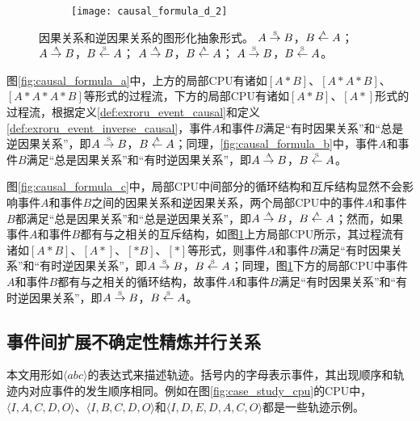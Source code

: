 \begin{figure}[htbp]
\begin{subfigure}{0.85\textwidth}
\begin{minipage}[b]{1\textwidth}
  	  \vspace{1em}
  	  \centering
  	  \texttt{[image: causal\_formula\_d\_2]}
  	\end{minipage}
  	\caption{}
  	\label{fig:causal_formula_d}
  \end{subfigure}
  \vspace{6pt}
  \caption{因果关系和逆因果关系的图形化抽象形式。 $A\overset{\text{\tiny{S}}}{\rightarrow}B$，$B\overset{\text{\tiny{A}}}{\leftarrow}A$； $A\overset{\text{\tiny{A}}}{\rightarrow}B$，$B\overset{\text{\tiny{S}}}{\leftarrow}A$； $A\overset{\text{\tiny{A}}}{\rightarrow}B$，$B\overset{\text{\tiny{A}}}{\leftarrow}A$； $A\overset{\text{\tiny{S}}}{\rightarrow}B$，$B\overset{\text{\tiny{S}}}{\leftarrow}A$。}
  \label{fig:event_causal_formulas}
\end{figure}

图\ref{fig:causal_formula_a}中，上方的局部CPU有诸如$[A*B]$、$[A*A*B]$、$[A*A*A*B]$等形式的过程流，下方的局部CPU有诸如$[A*B]$、$[A*]$形式的过程流，根据定义\ref{def:exroru_event_causal}和定义\ref{def:exroru_event_inverse_causal}，事件$A$和事件$B$满足“有时因果关系”和“总是逆因果关系”，即$A\overset{\text{\tiny{S}}}{\rightarrow}B$，$B\overset{\text{\tiny{A}}}{\leftarrow}A$；同理，\ref{fig:causal_formula_b}中，事件$A$和事件$B$满足“总是因果关系”和“有时逆因果关系”，即$A\overset{\text{\tiny{A}}}{\rightarrow}B$，$B\overset{\text{\tiny{S}}}{\leftarrow}A$。

图\ref{fig:causal_formula_c}中，局部CPU中间部分的循环结构和互斥结构显然不会影响事件$A$和事件$B$之间的因果关系和逆因果关系，两个局部CPU中的事件$A$和事件$B$都满足“总是因果关系”和“总是逆因果关系”，即$A\overset{\text{\tiny{A}}}{\rightarrow}B$，$B\overset{\text{\tiny{A}}}{\leftarrow}A$；然而，如果事件$A$和事件$B$都有与之相关的互斥结构，如图\ref{fig:causal_formula_d}上方局部CPU所示，其过程流有诸如$[A*B]$、$[A*]$、$[*B]$、$[*]$等形式，则事件$A$和事件$B$满足“有时因果关系”和“有时逆因果关系”，即$A\overset{\text{\tiny{S}}}{\rightarrow}B$，$B\overset{\text{\tiny{S}}}{\leftarrow}A$；同理，图\ref{fig:causal_formula_d}下方的局部CPU中事件$A$和事件$B$都有与之相关的循环结构，故事件$A$和事件$B$满足“有时因果关系”和“有时逆因果关系”，即$A\overset{\text{\tiny{S}}}{\rightarrow}B$，$B\overset{\text{\tiny{S}}}{\leftarrow}A$。

\subsection{事件间扩展不确定性精炼并行关系}\label{subsec:exroru_event_concurrent}
本文用形如$\langle abc\rangle$的表达式来描述轨迹。括号内的字母表示事件，其出现顺序和轨迹内对应事件的发生顺序相同。例如在图\ref{fig:case_study_cpu}的CPU中，$\langle I,A,C,D,O\rangle$、$\langle I,B,C,D,O\rangle$和$\langle I,D,E,D,A,C,O\rangle$都是一些轨迹示例。

